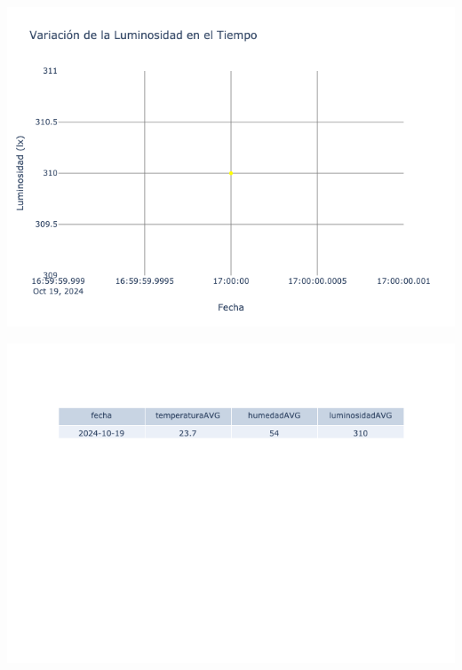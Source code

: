 \documentclass{article}
\begin{document}
    \noindent
    \begin{minipage}{0.48\textwidth}
        \centering
        \includegraphics[width=\textwidth]{../img/poli/LS702-90Dias-03-12-2024.png}
    \end{minipage}
    \hfill
    \begin{minipage}{0.48\textwidth}
        \centering
        \includegraphics[width=\textwidth]{../img/tables/CAVG702-90Dias-03-12-2024.png}
    \end{minipage}
    

    
\end{document}
